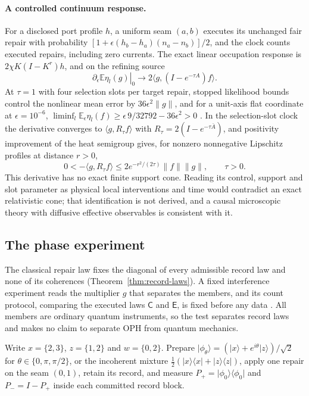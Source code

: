 \documentclass[11pt]{article}
\theoremstyle{definition}
\theoremstyle{remark}
\theoremstyle{plain}
\newcommand{\ket}[1]{\lvert #1\rangle}
\newcommand{\proj}[1]{\lvert #1\rangle\langle #1\rvert}
\newcommand{\Ex}{\mathbb{E}}
\newcommand{\Cn}{\mathsf{C}}
\newcommand{\En}{\mathsf{E}}
\begin{document}
\paragraph{A controlled continuum response.}
For a disclosed port profile $h$, a uniform seam $(a,b)$ executes its
unchanged fair repair with probability
$[1+\epsilon(h_b-h_a)(n_a-n_b)]/2$, and the clock counts executed repairs,
including zero currents. The exact linear occupation response is
$2\chi K(I-K^r)h$, and on the refining source
\[
 \left.\partial_\epsilon\Ex\eta_l(g)\right|_0
 \longrightarrow 2\langle g,(I-e^{-\tau A})f\rangle.
\]
At $\tau=1$ with four selection slots per target repair, stopped likelihood
bounds control the nonlinear mean error by $36\epsilon^2\|g\|$, and for a
unit-axis flat coordinate at $\epsilon=10^{-6}$,
$\liminf_l\Ex_\epsilon\eta_l(f)\ge\epsilon\,9/32792-36\epsilon^2>0$
\cite{nativeContinuum}. In the selection-slot clock the derivative converges
to $\langle g,R_\tau f\rangle$ with $R_\tau=2(I-e^{-\tau\bar A})$, and positivity
improvement of the heat semigroup gives, for nonzero nonnegative Lipschitz
profiles at distance $r>0$,
\[
 0<-\langle g,R_\tau f\rangle
   \le2e^{-r^2/(2\tau)}\|f\|\|g\|,\qquad \tau>0.
\]
This derivative has no exact finite support cone. Reading its control,
support and slot parameter as physical local interventions and time would
contradict an exact relativistic cone; that identification is not derived,
and a causal microscopic theory with diffusive effective observables is
consistent with it.

\subsection{The phase experiment}
\label{sec:ce-protocol}

The classical repair law fixes the diagonal of every admissible record law
and none of its coherences (Theorem~\ref{thm:record-laws}). A fixed
interference experiment reads the multiplier $g$ that separates the members,
and its count protocol, comparing the executed laws $\Cn$ and $\En$, is fixed
before any data \cite{prREADME,prDERIV}. All members are ordinary quantum
instruments, so the test separates record laws and makes no claim to
separate OPH from quantum mechanics.

Write $x=\{2,3\}$, $z=\{1,2\}$ and $w=\{0,2\}$. Prepare
$\ket{\phi_\theta}=(\ket x+e^{i\theta}\ket z)/\sqrt2$ for
$\theta\in\{0,\pi,\pi/2\}$, or the incoherent mixture
$\frac12(\proj x+\proj z)$, apply one repair on the seam $(0,1)$, retain its
record, and measure $P_+=\proj{\phi_0}$ and $P_-=I-P_+$ inside each committed
record block.
\end{document}
